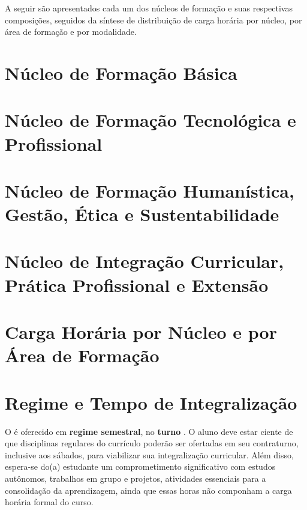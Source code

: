 A seguir são apresentados cada um dos núcleos de formação e suas respectivas composições, seguidos da síntese de distribuição de carga horária por núcleo, por área de formação e por modalidade.

\section{Núcleo de Formação Básica}


\section{Núcleo de Formação Tecnológica e Profissional}


\section{Núcleo de Formação Humanística, Gestão, Ética e Sustentabilidade}


\section{Núcleo de Integração Curricular, Prática Profissional e Extensão}



\section{Carga Horária por Núcleo e por Área de Formação}




\section{Regime e Tempo de Integralização}
\label{sec:regime}

O \ppccurso é oferecido em \textbf{regime semestral}, no \textbf{turno \ppcturno}. O aluno deve estar ciente de que disciplinas regulares do currículo poderão ser ofertadas em seu contraturno, inclusive aos sábados, para viabilizar sua integralização curricular. Além disso, espera-se do(a) estudante um comprometimento significativo com estudos autônomos, trabalhos em grupo e projetos, atividades essenciais para a consolidação da aprendizagem, ainda que essas horas não componham a carga horária formal do curso.

